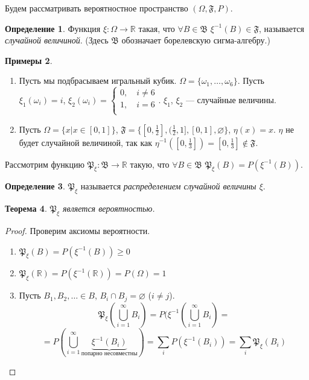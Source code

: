 \documentclass[11pt,openany,a4paper]{scrartcl}
\theoremstyle{plain}
\newtheorem{theorem}{Теорема}[section]
\theoremstyle{definition}
\newtheorem{definition}[theorem]{Определение}
\newtheorem{examples}[theorem]{Примеры}
\newcommand\mb{\mathbb}
\newcommand\real{\mb R}
\newcommand{\distr}{\mathfrak P_\xi}
\begin{document}
Будем рассматривать вероятностное пространство $(\Omega, \mathfrak{F}, P)$.

\begin{definition}
    Функция $\xi: \Omega \to \real$ такая, что
    $\forall B \in \mathfrak B$
    $\xi^{-1}(B) \in \mathfrak F$, называется \emph{случайной величиной}.
    (Здесь $\mathfrak B$ обозначает борелевскую сигма-алгебру.)
\end{definition}
\begin{examples}
    \begin{enumerate}
        \item Пусть мы подбрасываем игральный кубик.
        $\Omega = \{\omega_1,\ldots,\omega_6\}$. Пусть $\xi_1(\omega_i) = i$,
        $\xi_2(\omega_i) =
        \begin{cases}
            0,\quad i \neq 6\\
            1,\quad i = 6\\  
        \end{cases}
        $. $\xi_1$, $\xi_2$ — случайные величины.
        \item Пусть $\Omega = \{x \big| x \in [0, 1]\}$,
        $\mathfrak F = \{[0, \frac{1}{2}],
        (\frac{1}{2}, 1], [0, 1], \varnothing\}$,
        $\eta(x) = x$. $\eta$ не будет случайной величиной, так как
        $\eta^{-1}([0, \frac{1}{3}]) = [0, \frac{1}{3}] \notin \mathfrak F$.
    \end{enumerate}
\end{examples}

Рассмотрим функцию $\mathfrak P_\xi: \mathfrak B \to \real$ такую, что
$\forall B \in \mathfrak B$ $\mathfrak P_\xi(B) = P(\xi^{-1}(B))$.

\begin{definition}
    $\mathfrak P_\xi$ называется \emph{распределением случайной величины $\xi$}.
\end{definition}
\begin{theorem}
    $\mathfrak P_\xi$ является вероятностью.
\end{theorem}
\begin{proof}
    Проверим аксиомы вероятности.
    \begin{enumerate}
        \item $\distr(B) = P(\xi^{-1}(B)) \geqslant 0$
        \item $\distr (\real) =P(\xi^{-1}(\real)) = P(\Omega) = 1$
        \item Пусть $B_1, B_2, \ldots \in B$, $B_i \cap B_j = \varnothing$
        ($i \neq j$).
        $$
        \distr (\bigcup\limits_{i=1}^\infty B_i) =
        P(\xi^{-1}(\bigcup\limits_{i=1}^\infty B_i) =
        $$
        $$
        = P(\bigcup\limits_{i=1}^\infty \underbrace{\xi^{-1}
        (B_i)}_{\text{попарно несовместны}}) =
        \sum\limits_i P(\xi^{-1}(B_i)) = \sum\limits_i \distr (B_i)
        $$
    \end{enumerate}
\end{proof}
\end{document}
